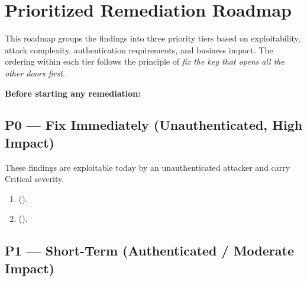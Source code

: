 \chapter{Prioritized Remediation Roadmap}
\label{ch:remediation}

This roadmap groups the findings into three priority tiers based on exploitability, attack
complexity, authentication requirements, and business impact. The ordering within each tier
follows the principle of \textit{fix the key that opens all the other doors first}.

\begin{warningbox}
  \textbf{Before starting any remediation:} 
\end{warningbox}

\section{P0 --- Fix Immediately (Unauthenticated, High Impact)}
\label{sec:p0}

These findings are exploitable today by an unauthenticated attacker and carry Critical severity.

\begin{enumerate}[leftmargin=*, label=\textbf{P0-\arabic*.}]
  \item \textbf{}
    (). 
  \item \textbf{}
    (). 
\end{enumerate}

\section{P1 --- Short-Term (Authenticated / Moderate Impact)}
\label{sec:p1}


